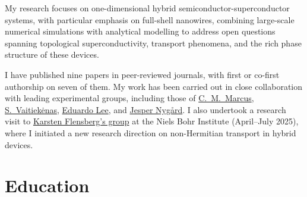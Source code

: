 \documentclass[10pt]{article} %
\begin{document}
\par\medskip\noindent
My research focuses on one-dimensional hybrid semiconductor-superconductor systems, with particular emphasis on full-shell nanowires, combining large-scale numerical simulations with analytical modelling to address open questions spanning topological superconductivity, transport phenomena, and the rich phase structure of these devices.

\par\medskip\noindent
I have published nine papers in peer-reviewed journals, with first or co-first authorship on seven of them. My work has been carried out in close collaboration with leading experimental groups, including those of \href{https://marcuslab.harvard.edu/}{C.~M.~Marcus}, \href{https://www.nbi.ku.dk/english/research/condensed-matter-physics/condensed-matter-theory/vaitiekenas-group/}{S.~Vaitiekėnas}, \href{https://scholar.google.com/citations?user=HUa20TAAAAAJ&hl=en}{Eduardo Lee}, and \href{https://nbi.ku.dk/english/staff/?pure=en/persons/67039}{Jesper Nygård}. I also undertook a research visit to \href{https://nbi.ku.dk/english/research/condensed-matter-physics/condensed-matter-theory/}{Karsten Flensberg's group} at the Niels Bohr Institute (April--July 2025), where I initiated a new research direction on non-Hermitian transport in hybrid devices.


\section{Education}



\end{document}

